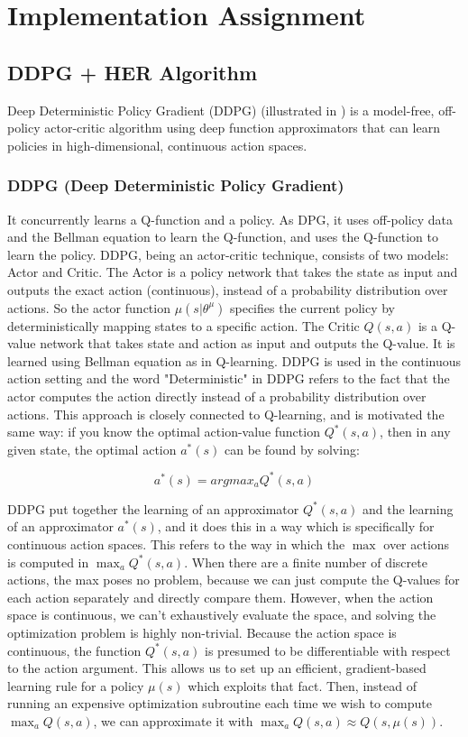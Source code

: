 \documentclass[a4paper]{report}
\begin{document}
\chapter{Implementation Assignment \label{ddpgalgo}}

\section{DDPG + HER Algorithm}
Deep Deterministic Policy Gradient (DDPG) (illustrated in \cite{ddpg}) is a model-free, off-policy actor-critic algorithm using deep function approximators that can learn policies in high-dimensional, continuous action spaces.

\subsection{DDPG (Deep Deterministic Policy Gradient)}
It concurrently learns a Q-function and a policy. As DPG, it uses off-policy data and the Bellman equation to learn the Q-function, and uses the Q-function to learn the policy. DDPG, being an actor-critic technique, consists of two models: Actor and Critic. The Actor is a policy network that takes the state as input and outputs the exact action (continuous), instead of a probability distribution over actions. So the actor function $\mu(s|\theta^{\mu})$ specifies the current policy by deterministically mapping states to a specific action. The Critic $Q(s,a)$ is a Q-value network that takes state and action as input and outputs the Q-value. It is learned using Bellman equation as in Q-learning. DDPG is used in the continuous action setting and the word "Deterministic" in DDPG refers to the fact that the actor computes the action directly instead of a probability distribution over actions. This approach is closely connected to Q-learning, and is motivated the same way: if you know the optimal action-value function $Q^*(s,a)$, then in any given state, the optimal action $a^*(s)$ can be found by solving:

\begin{equation}
a^*(s) = argmax_a Q^*(s, a)
\end{equation} 

DDPG put together the learning of an approximator $Q^*(s, a)$ and the learning of an approximator $a^*(s)$, and it does this in a way which is specifically for continuous action spaces. This refers to the way in which the $\max$ over actions is computed in $\max_a Q^*(s, a)$. When there are a finite number of discrete actions, the max poses no problem, because we can just compute the Q-values for each action separately and directly compare them. However, when the action space is continuous, we can't exhaustively evaluate the space, and solving the optimization problem is highly non-trivial. Because the action space is continuous, the function $Q^*(s,a)$ is presumed to be differentiable with respect to the action argument. This allows us to set up an efficient, gradient-based learning rule for a policy $\mu(s)$ which exploits that fact. Then, instead of running an expensive optimization subroutine each time we wish to compute $\max_a Q(s,a)$, we can approximate it with $\max_a Q(s,a) \approx Q(s,\mu(s))$.
\end{document}
